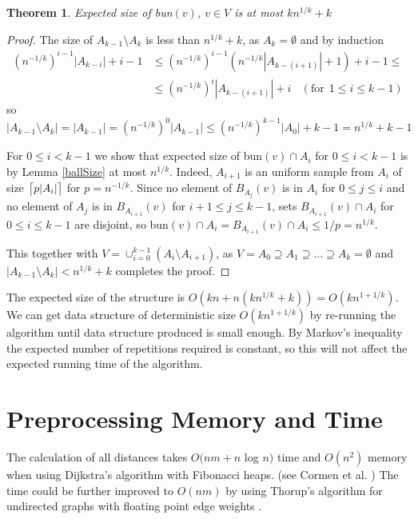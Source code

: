 \documentclass[shortabstract, lic, english]{iithesis}
\theoremstyle{definition} \newtheorem{definition}{Definition}[chapter]
\theoremstyle{plain} \newtheorem{remark}[definition]{Observation}
\theoremstyle{plain} \newtheorem{theorem}[definition]{Theorem}
\theoremstyle{plain} \newtheorem{lemma}[definition]{Lemma}
\theoremstyle{plain} \newtheorem{conjecture}[definition]{Conjecture}
\DeclarePairedDelimiter{\ceil}{\lceil}{\rceil}
\begin{document}
\begin{theorem}
    Expected size of bun$(v)$, $v \in V$ is at most $kn^{1/k} + k$
\end{theorem}
\begin{proof}
    The size of $A_{k-1} \setminus A_k$ is less than $n^{1/k} + k$, as $A_k = \emptyset$ and by induction
    \begin{align}
    (n^{-1/k})^{i-1} |A_{k-i}| + i - 1 &\leq (n^{-1/k})^{i-1} (n^{-1/k} |A_{k-(i+1)}| + 1) + i - 1 \leq \nonumber \\
    &\leq (n^{-1/k})^{i} |A_{k-(i+1)}| + i~~~~(\text{for}~~1 \leq i \leq k-1) \nonumber
    \end{align}
    so $|A_{k-1} \setminus A_k| = |A_{k-1}| = (n^{-1/k})^0 |A_{k-1}| \leq (n^{-1/k})^{k-1} |A_{0}| + k - 1 = n^{1/k} + k - 1$
    
    For $0 \leq i < k-1$ we show that expected size of bun$(v) \cap A_i$ for $0 \leq i < k-1$ is by Lemma \ref{ballSize}
    at most $n^{1/k}$. Indeed, $A_{i+1}$ is an uniform sample from $A_i$ of size $\ceil[\big]{p |A_i|}$ for $p = n^{-1/k}$.
    Since no element of $B_{A_j}(v)$ is in $A_i$ for $0 \leq j \leq i$ and
    no element of $A_{j}$ is in $B_{A_{i+1}}(v)$ for $i+1 \leq j \leq k-1$, sets $B_{A_{i+1}}(v) \cap A_i$ for $0 \leq i \leq k-1$ are disjoint, so
    bun$(v) \cap A_i = B_{A_{i+1}}(v) \cap A_i \leq 1/p = n^{1/k}$.
    
    This together with $V = \cup_{i=0}^{k-1} (A_i \setminus A_{i+1})$, as $V = A_0 \supseteq A_1 \supseteq \ldots \supseteq A_k = \emptyset$
    and $|A_{k-1} \setminus A_k| < n^{1/k} + k$ completes the proof.
\end{proof}

The expected size of the structure is $O(kn + n(kn^{1/k}+k)) = O(kn^{1 + 1/k})$.
We can get data structure of deterministic size $O(kn^{1 + 1/k})$ by re-running the algorithm
until data structure produced is small enough.
By Markov's inequality the expected number of repetitions required is constant, so this will not
affect the expected running time of the algorithm.

\section{Preprocessing Memory and Time}

The calculation of all distances takes $O(nm + n $ log $n)$ time and $O(n^2)$ memory
when using Dijkstra's algorithm with Fibonacci heaps. (see Cormen et al. \cite[Chapter 21]{cormen})
The time could be further improved to $O(nm)$ by using Thorup's algorithm for undirected graphs with floating point edge weights \cite{uberDijkstraInt, uberDijkstraFloat}.
\end{document}

